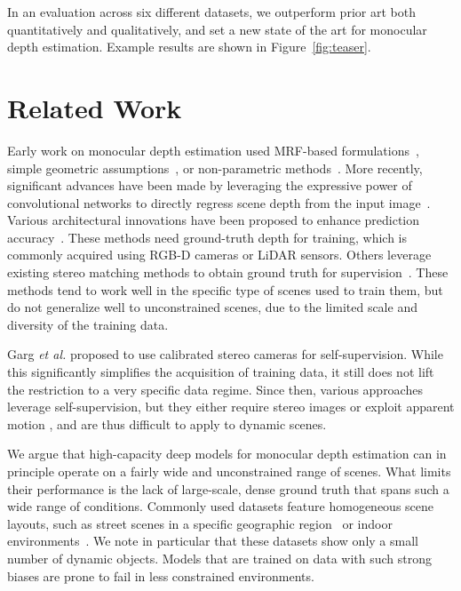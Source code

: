 In an evaluation across six different datasets, we outperform prior art both quantitatively and qualitatively, and set a new state of the art for monocular depth estimation. Example results are shown in Figure~\ref{fig:teaser}.

\section{Related Work}
\label{sec:related}

Early work on monocular depth estimation used MRF-based formulations~\cite{Saxena2009}, simple geometric assumptions~\cite{Hoiem2005}, or non-parametric methods~\cite{Karsch2014}. More recently, significant advances have been made by leveraging the expressive power of convolutional networks to directly regress scene depth from the input image~\cite{Eigen2014}. Various architectural innovations have been proposed to enhance prediction accuracy~\cite{Laina2016,Roy2016,Liu2015,Fu2018,Li18}. These methods need ground-truth depth for training, which is commonly acquired using \mbox{RGB-D} cameras or LiDAR sensors. Others leverage existing stereo matching methods to obtain ground truth for supervision~\cite{Guo2018,Luo2018}. These methods tend to work well in the specific type of scenes used to train them, but do not generalize well to unconstrained scenes, due to the limited scale and diversity of the training data.

Garg \MakeLowercase{\textit{et al.}} \cite{Garg2016} proposed to use calibrated stereo cameras for self-supervision. While this significantly simplifies the acquisition of training data, it still does not lift the restriction to a very specific data regime. Since then, various approaches leverage self-supervision, but they either require stereo images \cite{Godard2017,Zhan2018,Godard2019} or exploit apparent motion \cite{Zhou2017,Mahjourian2018,Casser2019,Godard2019}, and are thus difficult to apply to dynamic scenes.

We argue that high-capacity deep models for monocular depth estimation can in principle operate on a fairly wide and unconstrained range of scenes. What limits their performance is the lack of large-scale, dense ground truth that spans such a wide range of conditions. Commonly used datasets feature homogeneous scene layouts, such as street scenes in a specific geographic region~\cite{Geiger2012,MenzeGeiger2015,Saxena2009} or indoor environments~\cite{Silberman2012}. We note in particular that these datasets show only a small number of dynamic objects. Models that are trained on data with such strong biases are prone to fail in less constrained environments.

